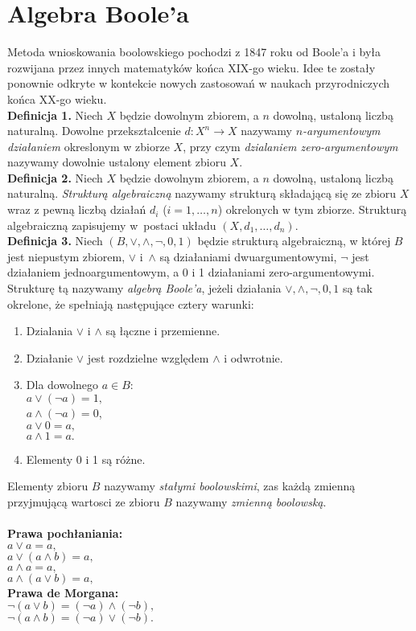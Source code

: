 \documentclass[a4paper,11pt,twoside]{article}
\theoremstyle{definition}
\begin{document}
\section*{Algebra Boole'a}

Metoda wnioskowania boolowskiego pochodzi z 1847 roku od Boole'a i była rozwijana przez innych matematyków końca XIX-go wieku. Idee te zostały ponownie odkryte w kontekcie nowych zastosowań w naukach przyrodniczych końca XX-go wieku.\newline \\
\textbf{Definicja 1.} Niech $X$ będzie dowolnym zbiorem, a $n$ dowolną, ustaloną liczbą naturalną. Dowolne przeksztalcenie $d\colon X^n \to X$ nazywamy {\em $n$-argumentowym działaniem} okreslonym w zbiorze $X$, przy czym {\em dzialaniem zero-argumentowym} nazywamy dowolnie ustalony element zbioru $X$.\newline \\
\textbf{Definicja 2.} Niech $X$ będzie dowolnym zbiorem, a $n$ dowolną, ustaloną liczbą naturalną. {\em Strukturą algebraiczną} nazywamy strukturą składającą się ze zbioru $X$ wraz z pewną liczbą działań $d_i$ ($i = 1,\dots,n$) okrelonych w tym zbiorze. Strukturą algebraiczną zapisujemy w~postaci układu $(X,d_1,\dots,d_n)$.\newline \\
\textbf{Definicja 3.} Niech $(B,\vee,\wedge,\neg,0,1)$ będzie strukturą algebraiczną, w której $B$ jest niepustym zbiorem, $\vee$ i~$\wedge$ są działaniami dwuargumentowymi, $\neg$ jest działaniem jednoargumentowym, a 0 i 1 działaniami zero-argumentowymi. Strukturę tą nazywamy {\em algebrą Boole'a}, jeżeli działania $\vee,\wedge,\neg,0,1$ są tak okrelone, że spełniają następujące cztery warunki:

\begin{enumerate}
\item Dzialania $\vee$ i $\wedge$ są łączne i przemienne.
\item Działanie $\vee$ jest rozdzielne względem $\wedge$ i odwrotnie.
\item Dla dowolnego $a \in B$:\\
$a \vee ({\neg}a) = 1,$\\
$a \wedge ({\neg}a) = 0$,\\
$a \vee 0 = a,$\\
$a \wedge 1 = a.$
\item Elementy 0 i 1 są różne.
\end{enumerate}

Elementy zbioru $B$ nazywamy {\em stałymi boolowskimi}, zas każdą zmienną przyjmującą wartosci ze zbioru $B$ nazywamy {\em zmienną boolowską}.\\ \\
{\bf Prawa pochłaniania:} \\
$a \vee a = a,$\\
$a \vee (a \wedge b) = a,$\\
$a \wedge a = a,$\\
$a \wedge(a \vee b) = a,$\\
{\bf Prawa de Morgana:}\\
$\neg(a \vee b) = ({\neg}a) \wedge ({\neg}b),$\\
$\neg(a \wedge b) = ({\neg}a) \vee ({\neg}b).$\\
\end{document}
